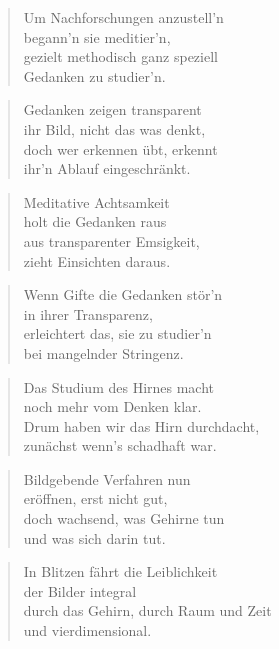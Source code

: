 \documentclass[10pt,a4paper]{article}
\begin{document}
\begin{paracol}{2}
\begin{verse}
Um Nachforschungen anzustell’n \\
begann’n sie meditier’n, \\
gezielt methodisch ganz speziell \\
Gedanken zu studier’n. \\
\end{verse}

\begin{verse}
Gedanken zeigen transparent \\
ihr Bild, nicht das was denkt, \\
doch wer erkennen übt, erkennt \\
ihr’n Ablauf eingeschränkt. \\
\end{verse}

\begin{verse}
Meditative Achtsamkeit \\
holt die Gedanken raus \\
aus transparenter Emsigkeit, \\
zieht Einsichten daraus. \\
\end{verse}

\begin{verse}
Wenn Gifte die Gedanken stör’n \\
in ihrer Transparenz, \\
erleichtert das, sie zu studier’n \\
bei mangelnder Stringenz. \\
\end{verse}

\begin{verse}
Das Studium des Hirnes macht \\
noch mehr vom Denken klar. \\
Drum haben wir das Hirn durchdacht, \\
zunächst wenn’s schadhaft war. \\
\end{verse}

\begin{verse}
Bildgebende Verfahren nun \\
eröffnen, erst nicht gut, \\
doch wachsend, was Gehirne tun \\
und was sich darin tut. \\
\end{verse}

\begin{verse}
In Blitzen fährt die Leiblichkeit \\
der Bilder integral \\
durch das Gehirn, durch Raum und Zeit \\
und vierdimensional. \\
\end{verse}


\end{paracol}
\end{document}
